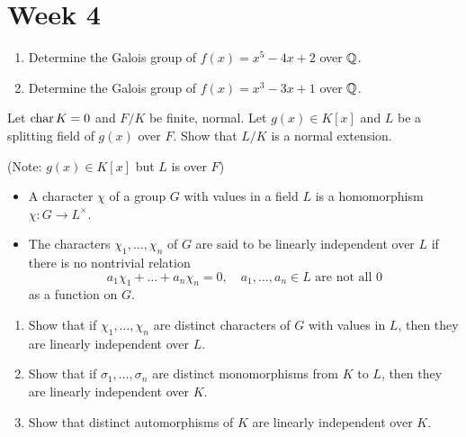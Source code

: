 
\section{Week 4}

\begin{exercise} \mbox{}
  \begin{enumerate}
    \item Determine the Galois group of $f(x) = x^5 - 4x + 2$ over $\mathbb{Q}$.
    \item Determine the Galois group of $f(x) = x^3 - 3x + 1$ over $\mathbb{Q}$.
  \end{enumerate}
\end{exercise}

\begin{exercise}
  Let $\operatorname{char} K = 0$ and $F/K$ be finite, normal.
  Let $g(x) \in K[x]$ and $L$ be a splitting field of $g(x)$ over $F$.
  Show that $L/K$ is a normal extension.

  (Note: $g(x) \in K[x]$ but $L$ is over $F$)
\end{exercise}

\begin{exercise}
  \begin{definition} \mbox{}
    \begin{itemize}
      \item A character $\chi$ of a group $G$ with values in a field $L$
        is a homomorphism $\chi: G \to L^\times$.
      \item The characters $\chi_1, \dots, \chi_n$ of $G$ are said to be
        linearly independent over $L$ if there is no nontrivial relation
        \[
          a_1\chi_1 + \dots + a_n\chi_n = 0,
          \quad a_1, \dots, a_n \in L \text{~are not all~} 0
        \]
        as a function on $G$.
    \end{itemize}
  \end{definition}
  \begin{enumerate}
    \item Show that if $\chi_1,\dots,\chi_n$ are distinct characters of $G$ with
      values in $L$, then they are linearly independent over $L$.
    \item Show that if $\sigma_1, \dots, \sigma_n$ are distinct monomorphisms
      from $K$ to $L$, then they are linearly independent over $K$.
    \item Show that distinct automorphisms of $K$ are linearly independent over
      $K$.
  \end{enumerate}
\end{exercise}

